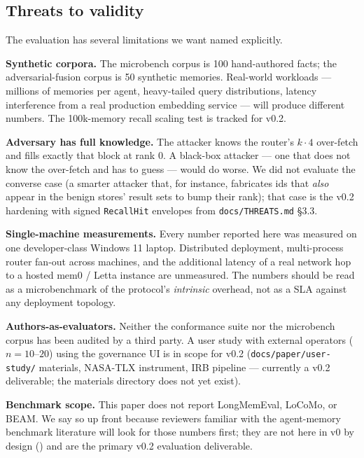 \documentclass[11pt,letterpaper,twocolumn]{article}
\begin{document}
\subsection{Threats to validity}
\label{sec:eval-threats}

The evaluation has several limitations we want named explicitly.

\textbf{Synthetic corpora.} The microbench corpus is 100 hand-authored facts; the adversarial-fusion corpus is 50 synthetic memories. Real-world workloads --- millions of memories per agent, heavy-tailed query distributions, latency interference from a real production embedding service --- will produce different numbers. The 100k-memory recall scaling test is tracked for v0.2.

\textbf{Adversary has full knowledge.} The  attacker knows the router's $k \cdot 4$ over-fetch and fills exactly that block at rank 0. A black-box attacker --- one that does not know the over-fetch and has to guess --- would do worse. We did not evaluate the converse case (a smarter attacker that, for instance, fabricates ids that \emph{also} appear in the benign stores' result sets to bump their rank); that case is the v0.2 hardening with signed \texttt{RecallHit} envelopes from \texttt{docs/THREATS.md} \S3.3.

\textbf{Single-machine measurements.} Every number reported here was measured on one developer-class Windows 11 laptop. Distributed deployment, multi-process router fan-out across machines, and the additional latency of a real network hop to a hosted mem0 / Letta instance are unmeasured. The numbers should be read as a microbenchmark of the protocol's \emph{intrinsic} overhead, not as a SLA against any deployment topology.

\textbf{Authors-as-evaluators.} Neither the conformance suite nor the microbench corpus has been audited by a third party. A user study with external operators ($n=10$--$20$) using the governance UI is in scope for v0.2 (\texttt{docs/paper/user-study/} materials, NASA-TLX instrument, IRB pipeline --- currently a v0.2 deliverable; the materials directory does not yet exist).

\textbf{Benchmark scope.} This paper does not report LongMemEval, LoCoMo, or BEAM. We say so up front because reviewers familiar with the agent-memory benchmark literature will look for those numbers first; they are not here in v0 by design () and are the primary v0.2 evaluation deliverable.
\end{document}
